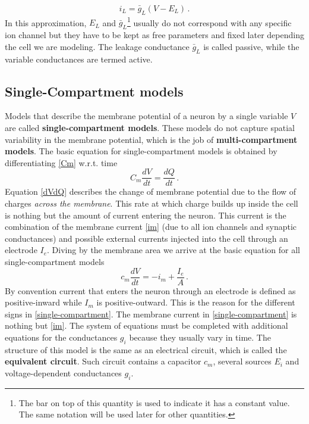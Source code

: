 \documentclass[titlepage]{article}
\begin{document}
\begin{equation}\label{IL}
i_L = \bar{g}_L (V - E_L)\,.
\end{equation}
In this approximation, $E_L$ and $\bar{g}_L$\footnote{The bar on top of this quantity is used to indicate it has a constant value. The same notation will be used later for other quantities.} usually do not correspond with any specific ion channel but they have to be kept as free parameters and fixed later depending the cell we are modeling. The leakage conductance $\bar{g}_L$ is called passive, while the variable conductances are termed active.

\subsection{Single-Compartment models}

Models that describe the membrane potential of a neuron by a single variable $V$ are called \textbf{single-compartment models}. These models do not capture spatial variability in the membrane potential, which is the job of \textbf{multi-compartment models}. The basic equation for single-compartment models is obtained by differentiating \eqref{Cm} w.r.t. time
\begin{equation}\label{dVdQ}
C_m \frac{d V}{d t} = \frac{d Q}{d t}\,.
\end{equation}
Equation \eqref{dVdQ} describes the change of membrane potential due to the flow of charges \textit{across the membrane}. This rate at which charge builds up inside the cell is nothing but the amount of current entering the neuron. This current is the combination of the membrane current \eqref{im} (due to all ion channels and synaptic conductances) and possible external currents injected into the cell through an electrode $I_e$. Diving by the membrane area we arrive at the basic equation for all single-compartment models
\begin{equation}\label{single-compartment}
c_m \frac{d V}{d t} = - i_m + \frac{I_e}{A}\,.
\end{equation}
By convention current that enters the neuron through an electrode is defined as positive-inward while $I_m$ is positive-outward. This is the reason for the different signs in \eqref{single-compartment}. The membrane current in \eqref{single-compartment} is nothing but \eqref{im}. The system of equations must be completed with additional equations for the conductances $g_i$ because they usually vary in time. The structure of this model is the same as an electrical circuit, which is called the \textbf{equivalent circuit}. Such circuit contains a capacitor $c_m$, several sources $E_i$ and voltage-dependent conductances $g_i$.
\end{document}
